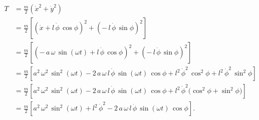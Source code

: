 \begin{equation}
    \begin{split}
        T 
        &= \frac{m}{2}\left(\dot{x}^{2} + \dot{y}^{2}\right) \\[1ex]
        &= \frac{m}{2}\left[
            \left(\dot{x} + l\,\dot{\phi}\,\cos\phi\right)^{2}
            + \left(-\,l\,\dot{\phi}\,\sin\phi\right)^{2}
        \right] \\[1ex]
        &= \frac{m}{2}\left[
            \left(-\,a\,\omega\,\sin(\omega t) + l\,\dot{\phi}\,\cos\phi\right)^{2}
            + \left(-\,l\,\dot{\phi}\,\sin\phi\right)^{2}
        \right] \\[1ex]
        &= \frac{m}{2}\left[
            a^{2}\,\omega^{2}\,\sin^{2}(\omega t)
            - 2\,a\,\omega\,l\,\dot{\phi}\,\sin(\omega t)\,\cos\phi
            + l^{2}\,\dot{\phi}^{2}\,\cos^{2}\phi
            + l^{2}\,\dot{\phi}^{2}\,\sin^{2}\phi
        \right] \\[1ex]
        &= \frac{m}{2}\left[
            a^{2}\,\omega^{2}\,\sin^{2}(\omega t)
            - 2\,a\,\omega\,l\,\dot{\phi}\,\sin(\omega t)\,\cos\phi
            + l^{2}\,\dot{\phi}^{2}\bigl(\cos^{2}\phi + \sin^{2}\phi\bigr)
        \right] \\[1ex]
        &= \frac{m}{2}\left[
            a^{2}\,\omega^{2}\,\sin^{2}(\omega t)
            + l^{2}\,\dot{\phi}^{2}
            - 2\,a\,\omega\,l\,\dot{\phi}\,\sin(\omega t)\,\cos\phi
        \right].
    \end{split}
\end{equation}
 
